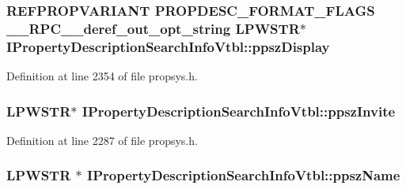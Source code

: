 \subsubsection[{\texorpdfstring{ppsz\+Display}{ppszDisplay}}]{ {\bf R\+E\+F\+P\+R\+O\+P\+V\+A\+R\+I\+A\+NT} {\bf P\+R\+O\+P\+D\+E\+S\+C\+\_\+\+F\+O\+R\+M\+A\+T\+\_\+\+F\+L\+A\+GS} {\bf \+\_\+\+\_\+\+R\+P\+C\+\_\+\+\_\+deref\+\_\+out\+\_\+opt\+\_\+string} {\bf L\+P\+W\+S\+TR}$\ast$ I\+Property\+Description\+Search\+Info\+Vtbl\+::ppsz\+Display}\hypertarget{struct_i_property_description_search_info_vtbl_a1c6e91b3f810e188be9bb69dc22a935b}{}\label{struct_i_property_description_search_info_vtbl_a1c6e91b3f810e188be9bb69dc22a935b}


Definition at line 2354 of file propsys.\+h.

\subsubsection[{\texorpdfstring{ppsz\+Invite}{ppszInvite}}]{ {\bf L\+P\+W\+S\+TR}$\ast$ I\+Property\+Description\+Search\+Info\+Vtbl\+::ppsz\+Invite}\hypertarget{struct_i_property_description_search_info_vtbl_ae0306f5756b6f0ce936df626c2ffd120}{}\label{struct_i_property_description_search_info_vtbl_ae0306f5756b6f0ce936df626c2ffd120}


Definition at line 2287 of file propsys.\+h.

\subsubsection[{\texorpdfstring{ppsz\+Name}{ppszName}}]{ {\bf L\+P\+W\+S\+TR} $\ast$ I\+Property\+Description\+Search\+Info\+Vtbl\+::ppsz\+Name}\hypertarget{struct_i_property_description_search_info_vtbl_a0f89022e9a3069b10eb5a2aa437d2b4a}{}\label{struct_i_property_description_search_info_vtbl_a0f89022e9a3069b10eb5a2aa437d2b4a}


